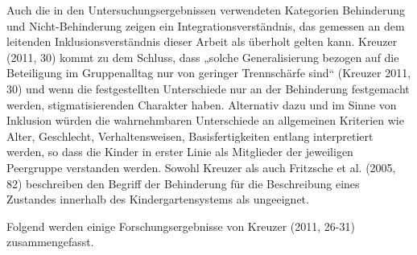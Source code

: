 Auch die in den Untersuchungsergebnissen verwendeten Kategorien Behinderung und Nicht-Behinderung zeigen ein Integrationsverständnis, das gemessen an dem leitenden Inklusionsverständnis dieser Arbeit als überholt gelten kann. Kreuzer (2011, 30) kommt zu dem Schluss, dass „solche Generalisierung bezogen auf die Beteiligung im Gruppenalltag nur von geringer Trennschärfe sind“ (Kreuzer 2011, 30) und wenn die festgestellten Unterschiede nur an der Behinderung festgemacht werden, stigmatisierenden Charakter haben. Alternativ dazu und im Sinne von Inklusion würden die wahrnehmbaren Unterschiede an allgemeinen Kriterien wie Alter, Geschlecht, Verhaltensweisen, Basisfertigkeiten entlang interpretiert werden, so dass die Kinder in erster Linie als Mitglieder der jeweiligen Peergruppe verstanden werden. Sowohl Kreuzer als auch Fritzsche et al. (2005, 82) beschreiben den Begriff der Behinderung für die Beschreibung eines Zustandes innerhalb des Kindergartensystems als ungeeignet. 

Folgend werden einige Forschungsergebnisse von Kreuzer (2011, 26-31) zusammengefasst.

